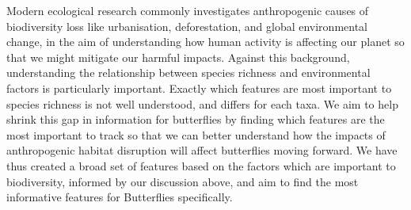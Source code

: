 \documentclass[prl,showpacs,superscriptaddress,twocolumn,longbibliography]{revtex4-1}
\begin{document}
\newline
\newline
Modern ecological research commonly investigates anthropogenic causes of biodiversity loss like urbanisation, deforestation, and global environmental change, in the aim of understanding how human activity is affecting our planet so that we might mitigate our harmful impacts\cite{hill_responses_2002, munguira_conservation_1995, white_human_2007, sanchez-bayo_worldwide_2019}. Against this background, understanding the relationship between species richness and environmental factors is particularly important. 
\newline
\newline
Exactly which features are most important to species richness is not well understood, and differs for each taxa. We aim to help shrink this gap in information for butterflies by finding which features are the most important to track so that we can better understand how the impacts of anthropogenic habitat disruption will affect butterflies moving forward. We have thus created a broad set of features based on the factors which are important to biodiversity, informed by our discussion above, and aim to find the most informative features for Butterflies specifically.
\end{document}

